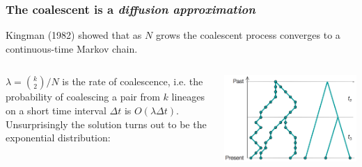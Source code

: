 





\begin{frame}
\frametitle{The coalescent is a \emph{diffusion approximation}}

Kingman (1982) showed that as $N$ grows the coalescent process converges to a
continuous-time Markov chain.

\medskip
\begin{columns}[t]


$\lambda = \binom{k}{2}/N$ is the rate of coalescence, i.e. the probability of coalescing a pair from $k$ lineages on a short time
interval $\Delta t$ is $O({\lambda\Delta t})$. Unsurprisingly the solution turns
out to be the exponential distribution:


\includegraphics[scale=0.18]{../images/wrightFisherToTree}


\end{columns}


\end{frame}
